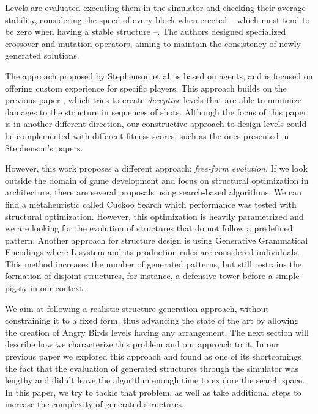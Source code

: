 \documentclass[a4paper,twoside]{article}
\begin{document}
Levels are evaluated executing them in the simulator and checking
their average stability, considering the speed of every block when
erected -- which must tend to be zero when having a stable structure
--. The authors designed specialized crossover and mutation operators,
aiming to maintain the consistency of newly generated solutions.

The approach proposed by Stephenson et al. \cite{stephenson2019agent}
is based on agents, and is focused on offering custom experience for
specific players. This approach builds on the previous paper
\cite{Stephenson2018DeceptiveAB}, which tries to create {\em
  deceptive} levels that are able to minimize damages to the structure
in sequences of shots. Although the focus of this paper is in another
different direction, our constructive approach to design levels could
be complemented with different fitness scores, such as the ones
presented in Stephenson's papers.

However, this work proposes a different approach: \textit{free-form
  evolution}.  If we look outside the domain of game development and
focus on structural optimization in architecture, there are several
proposals using search-based algorithms. We can find a metaheuristic
called Cuckoo Search \cite{gandomi2013cuckoo} which performance was
tested with structural optimization. However, this optimization is
heavily parametrized and we are looking for the evolution of
structures that do not follow a predefined pattern.  Another approach
for structure design is using Generative Grammatical Encodings
\cite{hornby2001advantages} where L-system and its production rules
are considered individuals. This method increases the number of
generated patterns,  but still restrains the formation of disjoint
structures, for instance, a defensive tower before a simple pigsty in
our context. 

We aim at following a realistic structure generation approach, without
constraining it to a fixed form, thus advancing the state of the art
by allowing the creation of Angry Birds levels having any
arrangement. The next section will describe how we characterize this
problem and our approach to it. In our previous paper
\cite{DBLP:conf/evoW/CalleGGV19anon} we explored this approach and found
as one of its shortcomings the fact that the evaluation of generated
structures through the simulator was lengthy and didn't leave the
algorithm enough time to explore the search space. In this paper, we
try to tackle that problem, as well as take additional steps to
increase the complexity of generated structures. 
\end{document}
